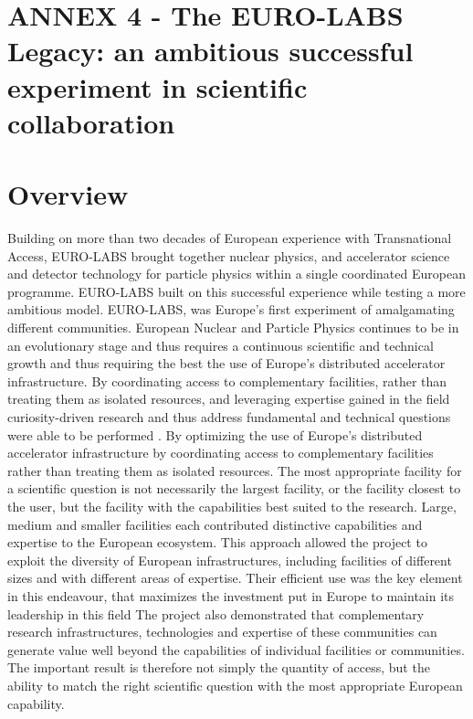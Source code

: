 \newpage
\section{ANNEX 4 - The EURO-LABS Legacy: an ambitious successful experiment in scientific collaboration} 
\section{Overview}
Building on more than two decades of European experience with Transnational Access, EURO-LABS brought together nuclear physics, and accelerator science and detector technology for particle physics within a single coordinated European programme. EURO-LABS built on this successful experience while testing a more ambitious model. EURO-LABS, was Europe’s first experiment of amalgamating different communities.  European Nuclear and Particle Physics continues to be in an evolutionary stage and thus requires a continuous scientific and technical growth and thus requiring the best  the use of Europe's distributed accelerator infrastructure. By coordinating access to complementary facilities, rather than treating them as isolated resources, and leveraging expertise gained in the field curiosity-driven research and thus address fundamental and technical questions were able to be performed  .  By  optimizing the use of Europe's distributed accelerator infrastructure by coordinating access to complementary facilities rather than treating them as isolated resources. The most appropriate facility for a scientific question is not necessarily the largest facility, or the facility closest to the user, but the facility with the capabilities best suited to the research. Large, medium and smaller facilities each contributed distinctive capabilities and expertise to the European ecosystem. This approach allowed the project to exploit the diversity of European infrastructures, including facilities of different sizes and with different areas of expertise. Their efficient use was the key element in this endeavour, that maximizes the investment put in Europe to maintain its leadership in this field  The project also demonstrated that complementary research infrastructures, technologies and expertise of these communities can generate value well beyond the capabilities of individual facilities or communities. The important result is therefore not simply the quantity of access, but the ability to match the right scientific question with the most appropriate European capability.


